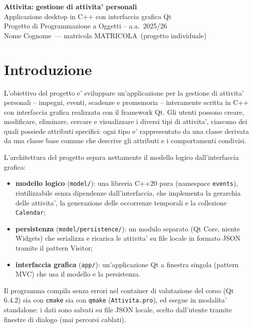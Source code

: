 \documentclass[10pt,a4paper]{article}
\newcommand{\studente}{Nome Cognome}
\newcommand{\matricola}{MATRICOLA}
\begin{document}
\begin{center}
{\LARGE\bfseries Attivita: gestione di attivita' personali}\\[4pt]
{\large Applicazione desktop in C++ con interfaccia grafica Qt}\\[8pt]
{\normalsize Progetto di Programmazione a Oggetti -- a.a.\ 2025/26}\\[4pt]
{\normalsize \studente\ --- matricola \matricola\ (progetto individuale)}
\end{center}

\vspace{6pt}
\noindent\hrulefill
\vspace{6pt}

\section{Introduzione}

L'obiettivo del progetto e' sviluppare un'applicazione per la gestione di
attivita' personali -- impegni, eventi, scadenze e promemoria -- interamente
scritta in C++ con interfaccia grafica realizzata con il framework Qt. Gli
utenti possono creare, modificare, eliminare, cercare e visualizzare i diversi
tipi di attivita', ciascuno dei quali possiede attributi specifici: ogni tipo e'
rappresentato da una classe derivata da una classe base comune che descrive gli
attributi e i comportamenti condivisi.

L'architettura del progetto separa nettamente il modello logico dall'interfaccia
grafica:

\begin{itemize}[nosep]
  \item \textbf{modello logico} (\texttt{model/}): una libreria C++20 pura
    (namespace \texttt{events}), riutilizzabile senza dipendenze dall'interfaccia,
    che implementa la gerarchia delle attivita', la generazione delle occorrenze
    temporali e la collezione \texttt{Calendar};
  \item \textbf{persistenza} (\texttt{model/persistence/}): un modulo separato
    (Qt Core, niente Widgets) che serializza e ricarica le attivita' su file
    locale in formato JSON tramite il pattern Visitor;
  \item \textbf{interfaccia grafica} (\texttt{app/}): un'applicazione Qt a
    finestra singola (pattern MVC) che usa il modello e la persistenza.
\end{itemize}

Il programma compila senza errori nel container di valutazione del corso
(Qt 6.4.2) sia con \texttt{cmake} sia con \texttt{qmake} (\texttt{Attivita.pro}),
ed esegue in modalita' standalone: i dati sono salvati su file JSON locale,
scelto dall'utente tramite finestre di dialogo (mai percorsi cablati).
\end{document}
